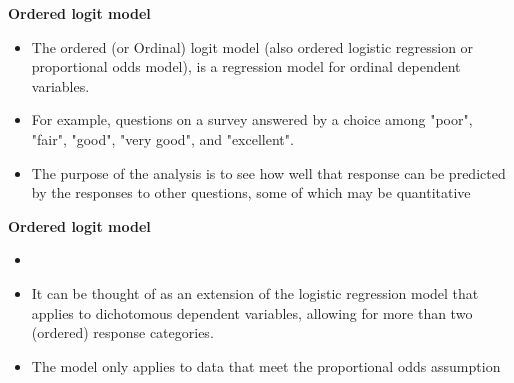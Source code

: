 \documentclass[00-GLMregslides.tex]{subfiles}
\begin{document}
\begin{frame}
\textbf{Ordered logit model}

\begin{itemize}
\item The ordered (or Ordinal) logit model (also ordered logistic regression or proportional odds model), is a regression model for ordinal dependent variables. 
\item For example, questions on a survey answered by a choice among "poor", "fair", "good", "very good", and "excellent".
\item The purpose of 
the analysis is to see how well that response can be predicted by the responses to other questions, some of which may be quantitative
\end{itemize}

\end{frame}

\begin{frame}
\textbf{Ordered logit model}

\begin{itemize}
\item 
\item It can be thought of as an extension of the 
logistic regression model that applies to dichotomous dependent variables, allowing for more than two (ordered) response categories.
\item The model only applies to data that meet the proportional odds assumption
\end{itemize}
\end{frame}




\end{document}
